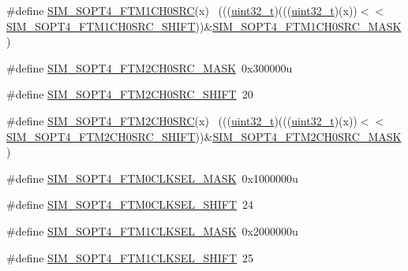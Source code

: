 \begin{DoxyCompactItemize}
\#define \hyperlink{group___s_i_m___register___masks_gadce9eb5cf4628062440e4c30611c8681}{S\+I\+M\+\_\+\+S\+O\+P\+T4\+\_\+\+F\+T\+M1\+C\+H0\+S\+RC}(x)                                ~(((\hyperlink{_p_e___types_8h_a33594304e786b158f3fb30289278f5af}{uint32\+\_\+t})(((\hyperlink{_p_e___types_8h_a33594304e786b158f3fb30289278f5af}{uint32\+\_\+t})(x))$<$$<$\hyperlink{group___s_i_m___register___masks_gaee4e8fb1805bded49220a407c1620345}{S\+I\+M\+\_\+\+S\+O\+P\+T4\+\_\+\+F\+T\+M1\+C\+H0\+S\+R\+C\+\_\+\+S\+H\+I\+FT}))\&\hyperlink{group___s_i_m___register___masks_ga8be459723f070708becab666dc6abc47}{S\+I\+M\+\_\+\+S\+O\+P\+T4\+\_\+\+F\+T\+M1\+C\+H0\+S\+R\+C\+\_\+\+M\+A\+SK})
\item 
\#define \hyperlink{group___s_i_m___register___masks_ga0dcacc22852e0ee0a7a853a51b422b70}{S\+I\+M\+\_\+\+S\+O\+P\+T4\+\_\+\+F\+T\+M2\+C\+H0\+S\+R\+C\+\_\+\+M\+A\+SK}~0x300000u
\item 
\#define \hyperlink{group___s_i_m___register___masks_ga04d4aa6612f4d2df7d9e0e85f15f6dd6}{S\+I\+M\+\_\+\+S\+O\+P\+T4\+\_\+\+F\+T\+M2\+C\+H0\+S\+R\+C\+\_\+\+S\+H\+I\+FT}~20
\item 
\#define \hyperlink{group___s_i_m___register___masks_ga05f9da2ddf9e9aa2509b88a964cb91f6}{S\+I\+M\+\_\+\+S\+O\+P\+T4\+\_\+\+F\+T\+M2\+C\+H0\+S\+RC}(x)                                ~(((\hyperlink{_p_e___types_8h_a33594304e786b158f3fb30289278f5af}{uint32\+\_\+t})(((\hyperlink{_p_e___types_8h_a33594304e786b158f3fb30289278f5af}{uint32\+\_\+t})(x))$<$$<$\hyperlink{group___s_i_m___register___masks_ga04d4aa6612f4d2df7d9e0e85f15f6dd6}{S\+I\+M\+\_\+\+S\+O\+P\+T4\+\_\+\+F\+T\+M2\+C\+H0\+S\+R\+C\+\_\+\+S\+H\+I\+FT}))\&\hyperlink{group___s_i_m___register___masks_ga0dcacc22852e0ee0a7a853a51b422b70}{S\+I\+M\+\_\+\+S\+O\+P\+T4\+\_\+\+F\+T\+M2\+C\+H0\+S\+R\+C\+\_\+\+M\+A\+SK})
\item 
\#define \hyperlink{group___s_i_m___register___masks_gaac823c598ac790d9eeeeb7ddb86d1657}{S\+I\+M\+\_\+\+S\+O\+P\+T4\+\_\+\+F\+T\+M0\+C\+L\+K\+S\+E\+L\+\_\+\+M\+A\+SK}~0x1000000u
\item 
\#define \hyperlink{group___s_i_m___register___masks_ga77c42e9023c3ed2d759431e2c072860f}{S\+I\+M\+\_\+\+S\+O\+P\+T4\+\_\+\+F\+T\+M0\+C\+L\+K\+S\+E\+L\+\_\+\+S\+H\+I\+FT}~24
\item 
\#define \hyperlink{group___s_i_m___register___masks_ga0cd5cb92a9ea79e8227693c793ee5983}{S\+I\+M\+\_\+\+S\+O\+P\+T4\+\_\+\+F\+T\+M1\+C\+L\+K\+S\+E\+L\+\_\+\+M\+A\+SK}~0x2000000u
\item 
\#define \hyperlink{group___s_i_m___register___masks_ga04492b54a5b581b3bdef8568bdbabf91}{S\+I\+M\+\_\+\+S\+O\+P\+T4\+\_\+\+F\+T\+M1\+C\+L\+K\+S\+E\+L\+\_\+\+S\+H\+I\+FT}~25

\end{DoxyCompactItemize}
